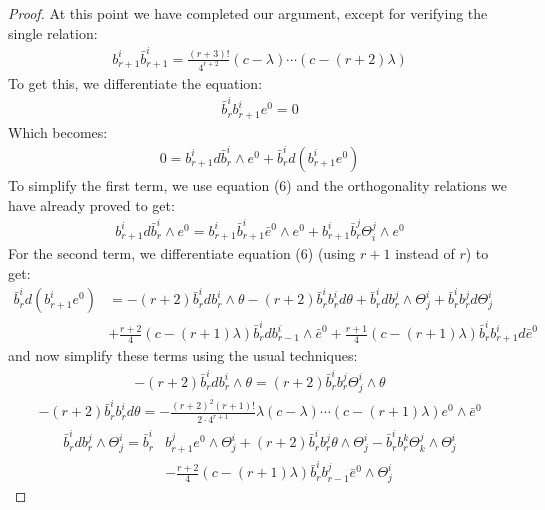 \documentclass[11pt]{amsart}
\theoremstyle{definition}
\begin{document}
\begin{proof}
\bigskip

At this point we have completed our argument, except for verifying the single relation:
%
\begin{align*}
b^i_{r+1} \bar{b}^i_{r+1} = \frac{(r+3)!}{4^{r+2}} (c- \lambda) \cdots (c - (r+2) \lambda )
\end{align*}
%
To get this, we differentiate the equation:
%
\begin{align*}
\bar{b}^i_r b^i_{r+1} e^0 = 0
\end{align*}
%
Which becomes:
%
\begin{align*}
0 = b^i_{r+1} d \bar{b}^i_r \wedge e^0 + \bar{b}^i_r d( b^i_{r+1} e^0 )
\end{align*}
%
To simplify the first term, we use equation (6) and the orthogonality relations we have already proved to get:
%
\begin{align*}
b^i_{r+1} d \bar{b}^i_r \wedge e^0 = b^i_{r+1} \bar{b}^i_{r+1} \bar{e}^0 \wedge e^0 + b^i_{r+1} \bar{b}^j_{r} \Theta^j_i \wedge e^0
\end{align*}
%
For the second term, we differentiate equation (6) (using $r+1$ instead of $r$) to get:
%
\begin{align*}
\bar{b}^i_r d( b^i_{r+1} e^0 ) &= - (r+2) \bar{b}^i_r d b^i_r \wedge \theta - (r+2) \bar{b}^i_r b^i_r d \theta + \bar{b}^i_r d b^j_r \wedge \Theta^i_j + \bar{b}^i_r b^j_r d \Theta^i_j \\
&+ \frac{r+2}{4}( c  - (r+1) \lambda ) \bar{b}^i_r d b^i_{r-1} \wedge \bar{e}^0 + \frac{r+1}{4} (c - (r+1) \lambda ) \bar{b}^i_r b^i_{r+1} d \bar{e}^0
\end{align*}
%
and now simplify these terms using the usual techniques:
%
\begin{align*}
- (r+2) \bar{b}^i_r d b^i_r \wedge \theta = (r+2) \bar{b}^i_r b^j_r \Theta^i_j \wedge \theta
\end{align*}
%
\begin{align*}
- (r+2) \bar{b}^i_r b^i_r d \theta = - \frac{(r+2)^2 (r+1)!}{2 \cdot 4^{r+1}} \lambda (c- \lambda) \cdots (c - (r+1) \lambda) e^0 \wedge \bar{e}^0
\end{align*}
%
\begin{align*}
\bar{b}^i_r d b^j_r \wedge \Theta^i_j = \bar{b}^i_r & b^j_{r+1} e^0 \wedge \Theta^i_j + (r+2) \bar{b}^i_r b^j_r \theta \wedge \Theta^i_j - \bar{b}^i_r b^k_r \Theta^j_k \wedge \Theta^i_j \\
&- \frac{r+2}{4} (c - (r + 1) \lambda ) \bar{b}^i_r b^j_{r-1} \bar{e}^0 \wedge \Theta^i_j
\end{align*}

\end{proof}
\end{document}
